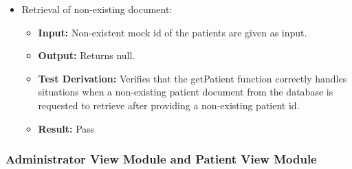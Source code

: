 \documentclass[12pt, titlepage]{article}
\begin{document}
\begin{enumerate}
\begin{itemize}
    \item Retrieval of non-existing document:

    \begin{itemize}
      \item \textbf{Input:} Non-existent mock id of the patients are given as input.  
      \item \textbf{Output:} Returns null. 
      \item \textbf{Test Derivation:} Verifies that the getPatient function correctly handles situations when a non-existing patient document from the database is requested to retrieve after providing a non-existing patient id.
      \item \textbf{Result:} Pass
    \end{itemize}
  \end{itemize}
\end{enumerate}

\subsubsection{Administrator View Module and Patient View Module}
\end{document}
